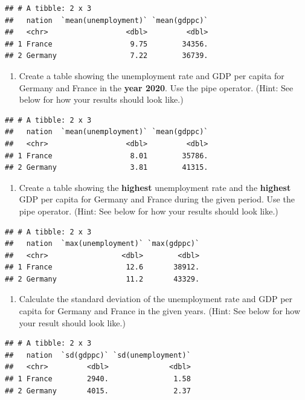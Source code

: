 \documentclass[
  12pt,
  oneside]{book}
\providecommand{\tightlist}{%
  \setlength{\itemsep}{0pt}\setlength{\parskip}{0pt}}
\begin{document}
\begin{verbatim}
## # A tibble: 2 x 3
##   nation  `mean(unemployment)` `mean(gdppc)`
##   <chr>                  <dbl>         <dbl>
## 1 France                  9.75        34356.
## 2 Germany                 7.22        36739.
\end{verbatim}

\begin{enumerate}
\def\labelenumi{(\arabic{enumi})}
\setcounter{enumi}{15}
\tightlist
\item
  Create a table showing the unemployment rate and GDP per capita for Germany
  and France in the \textbf{year 2020}. Use the pipe operator. (Hint: See below for how your results should
  look like.)
\end{enumerate}

\begin{verbatim}
## # A tibble: 2 x 3
##   nation  `mean(unemployment)` `mean(gdppc)`
##   <chr>                  <dbl>         <dbl>
## 1 France                  8.01        35786.
## 2 Germany                 3.81        41315.
\end{verbatim}

\begin{enumerate}
\def\labelenumi{(\arabic{enumi})}
\setcounter{enumi}{16}
\tightlist
\item
  Create a table showing the \textbf{highest} unemployment rate and the \textbf{highest}
  GDP per capita for Germany and France during the given period.
  Use the pipe operator. (Hint: See below for how your results should look like.)
\end{enumerate}

\begin{verbatim}
## # A tibble: 2 x 3
##   nation  `max(unemployment)` `max(gdppc)`
##   <chr>                 <dbl>        <dbl>
## 1 France                 12.6       38912.
## 2 Germany                11.2       43329.
\end{verbatim}

\begin{enumerate}
\def\labelenumi{(\arabic{enumi})}
\setcounter{enumi}{17}
\tightlist
\item
  Calculate the standard deviation of the unemployment rate and GDP per capita for Germany
  and France in the given years. (Hint: See below for how your result should
  look like.)
\end{enumerate}

\begin{verbatim}
## # A tibble: 2 x 3
##   nation  `sd(gdppc)` `sd(unemployment)`
##   <chr>         <dbl>              <dbl>
## 1 France        2940.               1.58
## 2 Germany       4015.               2.37
\end{verbatim}
\end{document}

